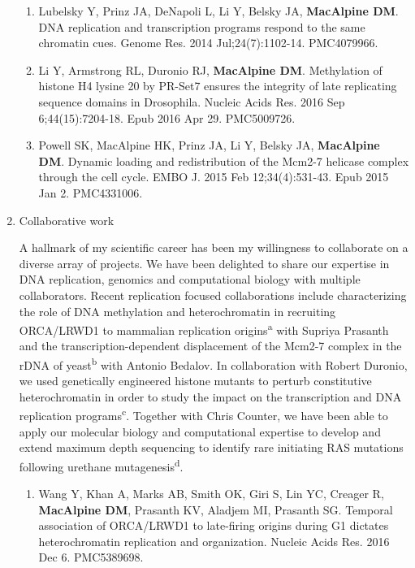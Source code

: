 \documentclass{update_nihbiosketch}
\begin{document}
\begin{enumerate}
\begin{enumerate}
\item Lubelsky Y, Prinz JA, DeNapoli L, Li Y, Belsky JA, \textbf{MacAlpine DM}. DNA
replication and transcription programs respond to the same chromatin cues. Genome Res. 2014 Jul;24(7):1102-14. PMC4079966.

\item Li Y, Armstrong RL, Duronio RJ, \textbf{MacAlpine DM}. Methylation of histone H4 lysine 20 by PR-Set7 ensures the integrity of late replicating sequence domains in Drosophila. Nucleic Acids Res. 2016 Sep 6;44(15):7204-18.  Epub 2016 Apr 29. PMC5009726.

\item Powell SK, MacAlpine HK, Prinz JA, Li Y, Belsky JA, \textbf{MacAlpine DM}. Dynamic
loading and redistribution of the Mcm2-7 helicase complex through the cell cycle. EMBO J. 2015 Feb 12;34(4):531-43. Epub 2015 Jan 2. PMC4331006.


\end{enumerate}

\item Collaborative work

\noindent A hallmark of my scientific career has been my willingness to collaborate on a diverse array of projects.  We have been delighted to share our expertise in DNA replication, genomics and computational biology with multiple collaborators.  Recent replication focused collaborations include characterizing the role of DNA methylation and heterochromatin in recruiting ORCA/LRWD1 to mammalian replication origins\textsuperscript{a} with Supriya Prasanth and the transcription-dependent displacement of the Mcm2-7 complex in the rDNA of yeast\textsuperscript{b} with Antonio Bedalov.  In collaboration with Robert Duronio, we used genetically engineered histone mutants to perturb constitutive heterochromatin in order to study the impact on the transcription and DNA replication programs\textsuperscript{c}.  Together with Chris Counter, we have been able to apply our molecular biology and computational expertise to develop and extend maximum depth sequencing to identify rare initiating RAS mutations following urethane mutagenesis\textsuperscript{d}.  



\begin{enumerate}
\setlength\itemsep{0.35em}


\item Wang Y, Khan A, Marks AB, Smith OK, Giri S, Lin YC, Creager R, \textbf{MacAlpine DM},
Prasanth KV, Aladjem MI, Prasanth SG. Temporal association of ORCA/LRWD1 to
late-firing origins during G1 dictates heterochromatin replication and
organization. Nucleic Acids Res. 2016 Dec 6. PMC5389698.



\end{enumerate}
\end{enumerate}
\end{document}
